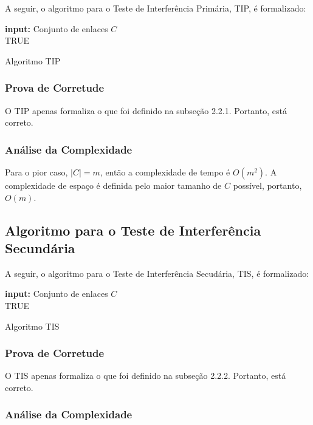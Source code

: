 A seguir, o algoritmo para o Teste de Interferência Primária, TIP, é formalizado:

\begin{algorithm}[h]
	\SetVline
	{\bf input:} Conjunto de enlaces $C$\\
	\Return TRUE
\caption{Algoritmo TIP}
\label{alg:tip}
\end{algorithm}


\subsubsection{Prova de Corretude}

O TIP apenas formaliza o que foi definido na subseção 2.2.1. Portanto, está correto. 

\subsubsection{Análise da Complexidade}

Para o pior caso, $|C|=m$, então a complexidade de tempo é $O(m^2)$. A complexidade de espaço é definida pelo maior tamanho de $C$ possível, portanto, $O(m)$.

\subsection{Algoritmo para o Teste de Interferência Secundária}

A seguir, o algoritmo para o Teste de Interferência Secudária, TIS, é formalizado:

\begin{algorithm}[h]
	\SetVline
	{\bf input:} Conjunto de enlaces $C$\\
	\Return TRUE
\caption{Algoritmo TIS}
\label{alg:tis}
\end{algorithm}

\subsubsection{Prova de Corretude}

O TIS apenas formaliza o que foi definido na subseção 2.2.2. Portanto, está correto.

\subsubsection{Análise da Complexidade}

